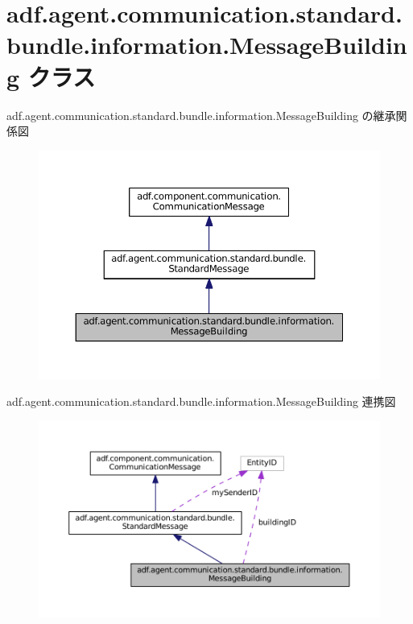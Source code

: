 \hypertarget{classadf_1_1agent_1_1communication_1_1standard_1_1bundle_1_1information_1_1MessageBuilding}{}\section{adf.\+agent.\+communication.\+standard.\+bundle.\+information.\+Message\+Building クラス}
\label{classadf_1_1agent_1_1communication_1_1standard_1_1bundle_1_1information_1_1MessageBuilding}


adf.\+agent.\+communication.\+standard.\+bundle.\+information.\+Message\+Building の継承関係図
\nopagebreak
\begin{figure}[H]
\begin{center}
\leavevmode
\includegraphics[width=350pt]{classadf_1_1agent_1_1communication_1_1standard_1_1bundle_1_1information_1_1MessageBuilding__inherit__graph}
\end{center}
\end{figure}


adf.\+agent.\+communication.\+standard.\+bundle.\+information.\+Message\+Building 連携図
\nopagebreak
\begin{figure}[H]
\begin{center}
\leavevmode
\includegraphics[width=350pt]{classadf_1_1agent_1_1communication_1_1standard_1_1bundle_1_1information_1_1MessageBuilding__coll__graph}
\end{center}
\end{figure}
